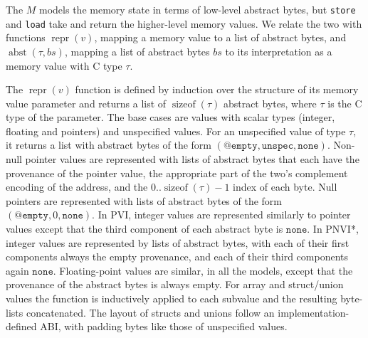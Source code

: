\documentclass[acmsmall,review,screen]{acmart}\settopmatter{printfolios=true,printccs=false,printacmref=false}
\makeatletter
\DeclareMathOperator{\sizeof}{sizeof}
\DeclareMathOperator{\abst}{abst}
\DeclareMathOperator{\repr}{repr}
\newcommand{\provNone}{@\mathtt{empty}}
\newcommand{\unspec}{\mathtt{unspec}}
\newcommand{\none}{\mathtt{none}}
\makeatother
\begin{document}
The $M$ models the memory state in terms of low-level abstract
bytes, but   \texttt{store} and \texttt{load} take and return
the higher-level memory values. We relate the two with functions
$\repr(v)$, mapping a memory value to a list of abstract bytes, and
$\abst(\tau, bs)$, mapping a list of abstract bytes $bs$ to its
interpretation as a memory value with C type $\tau$.


The $\repr(v)$ function is defined by induction over the structure of its memory value
parameter and returns a list of $\sizeof(\tau)$ abstract bytes, where
$\tau$ is the C type of the parameter. The base cases are values with
scalar types (integer, floating and pointers) and unspecified values.
%
For an unspecified value of type $\tau$, it returns a list with abstract bytes of the form
$(\provNone, \unspec, \none)$.
%
Non-null pointer values are represented with lists of abstract bytes that
each have the provenance of the pointer value, 
the appropriate part of the two's complement encoding of the address,
and the $0..\sizeof(\tau)-1$ index of each byte. 
Null pointers are represented with lists of abstract bytes of the form $(\provNone, 0,
\none)$. 
In PVI, integer values are represented similarly to pointer values
except that the third component of each abstract byte is $\none$.
In PNVI*, integer values are represented by lists of abstract bytes,
with each of their first components always the empty provenance,  and
each of their third components again $\none$.
%
Floating-point values are similar, in all the models, except that the provenance of the
abstract bytes
is always empty.
%
%
For array and struct/union values the function is inductively
applied to each subvalue and the resulting byte-lists concatenated.
The layout of structs and unions follow an
implementation-defined ABI, with padding bytes like those
of unspecified values.
\end{document}
